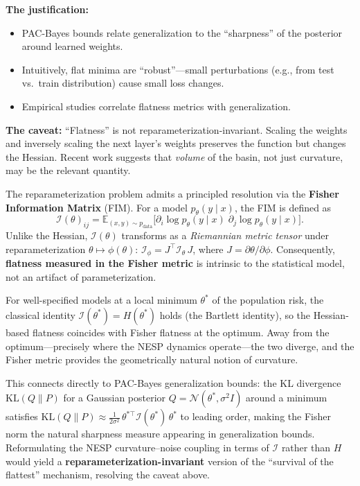 \documentclass[
  journal=largetwo,
  simfonts=false,
  year=2025,
  volume=37,
]{cup-journal}
\begin{document}
\textbf{The justification:}
\begin{itemize}
    \item PAC-Bayes bounds relate generalization to the ``sharpness'' of the posterior around learned weights.
    \item Intuitively, flat minima are ``robust''---small perturbations (e.g., from test vs.\ train distribution) cause small loss changes.
    \item Empirical studies correlate flatness metrics with generalization.
\end{itemize}

\textbf{The caveat:} ``Flatness'' is not reparameterization-invariant. Scaling the weights and inversely scaling the next layer's weights preserves the function but changes the Hessian. Recent work suggests that \textit{volume} of the basin, not just curvature, may be the relevant quantity.

\begin{remark}\label{rmk:fisher_flatness}
The reparameterization problem admits a principled resolution via the \textbf{Fisher Information Matrix} (FIM). For a model $p_\theta(y \mid x)$, the FIM is defined as
\begin{equation}\label{eq:fisher_information}
    \mathcal{I}(\theta)_{ij}
    = \mathbb{E}_{(x,y) \sim p_{\mathrm{data}}}
      \!\bigl[\partial_i \log p_\theta(y \mid x)\;\partial_j \log p_\theta(y \mid x)\bigr].
\end{equation}
Unlike the Hessian, $\mathcal{I}(\theta)$ transforms as a \emph{Riemannian metric tensor} under reparameterization $\theta \mapsto \phi(\theta)$:
$\mathcal{I}_\phi = J^\top \mathcal{I}_\theta\, J$, where $J = \partial\theta/\partial\phi$.
Consequently, \textbf{flatness measured in the Fisher metric} is intrinsic to the statistical model, not an artifact of parameterization.

For well-specified models at a local minimum $\theta^*$ of the population risk, the classical identity $\mathcal{I}(\theta^*) = H(\theta^*)$ holds (the Bartlett identity), so the Hessian-based flatness coincides with Fisher flatness at the optimum. Away from the optimum---precisely where the NESP dynamics operate---the two diverge, and the Fisher metric provides the geometrically natural notion of curvature.

This connects directly to PAC-Bayes generalization bounds: the KL divergence $\mathrm{KL}(Q \| P)$ for a Gaussian posterior $Q = \mathcal{N}(\theta^*, \sigma^2 I)$ around a minimum satisfies
$\mathrm{KL}(Q\|P) \approx \tfrac{1}{2\sigma^2}\,\theta^{*\top} \mathcal{I}(\theta^*)\,\theta^*$
to leading order, making the Fisher norm the natural sharpness measure appearing in generalization bounds. Reformulating the NESP curvature--noise coupling in terms of $\mathcal{I}$ rather than $H$ would yield a \textbf{reparameterization-invariant} version of the ``survival of the flattest'' mechanism, resolving the caveat above.
\end{remark}
\end{document}
